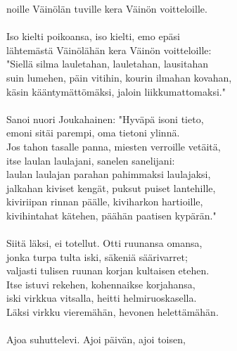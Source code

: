 noille Väinölän tuville kera Väinön voitteloille.             \\
                                                              \\
Iso kielti poikoansa, iso kielti, emo epäsi                   \\
lähtemästä Väinölähän kera Väinön voitteloille:               \\
"Siellä silma lauletahan, lauletahan, lausitahan              \\
suin lumehen, päin vitihin, kourin ilmahan kovahan,           \\
käsin kääntymättömäksi, jaloin liikkumattomaksi."             \\
                                                              \\
Sanoi nuori Joukahainen: "Hyväpä isoni tieto,                 \\
emoni sitäi parempi, oma tietoni ylinnä.                      \\
Jos tahon tasalle panna, miesten verroille vetäitä,           \\
itse laulan laulajani, sanelen sanelijani:                    \\
laulan laulajan parahan pahimmaksi laulajaksi,                \\
jalkahan kiviset kengät, puksut puiset lantehille,            \\
kiviriipan rinnan päälle, kiviharkon hartioille,              \\
kivihintahat kätehen, päähän paatisen kypärän."               \\
                                                              \\
Siitä läksi, ei totellut. Otti ruunansa omansa,               \\
jonka turpa tulta iski, säkeniä säärivarret;                  \\
valjasti tulisen ruunan korjan kultaisen etehen.              \\
Itse istuvi rekehen, kohennaikse korjahansa,                  \\
iski virkkua vitsalla, heitti helmiruoskasella.               \\
Läksi virkku vieremähän, hevonen helettämähän.                \\
                                                              \\
Ajoa suhuttelevi. Ajoi päivän, ajoi toisen,                   \\
